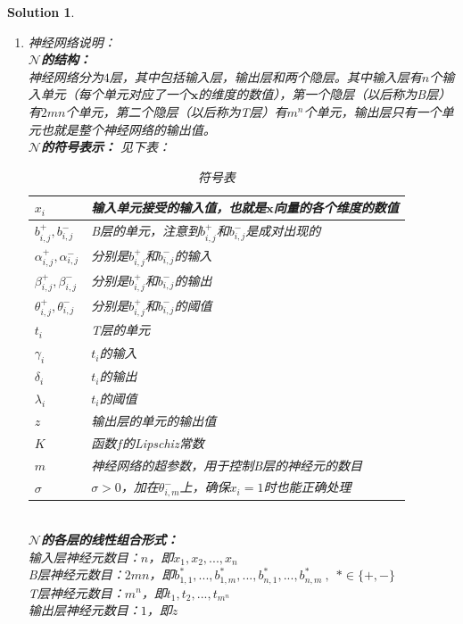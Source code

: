 \documentclass[a4paper,UTF8]{article}
\numberwithin{equation}{section}
\newtheorem*{solution}{Solution}
\begin{document}
\begin{solution}
\begin{enumerate}[ {(}1{)}]
\item 神经网络说明：\\
\textbf{$\mathcal{N}$的结构：}\\
神经网络分为$4$层，其中包括输入层，输出层和两个隐层。其中输入层有$n$个输入单元（每个单元对应了一个$\mathbf{x}$的维度的数值），第一个隐层（以后称为B层）有$2mn$个单元，第二个隐层（以后称为T层）有$m^n$个单元，输出层只有一个单元也就是整个神经网络的输出值。\\
\textbf{$\mathcal{N}$的符号表示：}
见下表：
\begin{table}[!h]
	\centering
	\caption{符号表}
	\label{my-label}
	\begin{tabular}{|l|l|}
		\hline
	$x_i$	& 输入单元接受的输入值，也就是$ \mathbf{x} $向量的各个维度的数值 \\ \hline
	$b_{i,j}^+, b_{i,j}^-$	& B层的单元，注意到$b_{i,j}^+$和$b_{i,j}^-$是成对出现的 \\ \hline
	$\alpha_{i,j}^+,\alpha_{i,j}^-$	& 分别是$b_{i,j}^+$和$b_{i,j}^-$的输入 \\ \hline
	$\beta_{i,j}^+,\beta_{i,j}^-$	& 分别是$b_{i,j}^+$和$b_{i,j}^-$的输出 \\ \hline
	$\theta_{i,j}^+,\theta_{i,j}^-$	& 分别是$b_{i,j}^+$和$b_{i,j}^-$的阈值 \\ \hline
	$t_i$	& T层的单元 \\ \hline
	$\gamma_i$	& $t_i$的输入 \\ \hline
	$\delta_i$	& $t_i$的输出 \\ \hline
	$\lambda_i$	& $t_i$的阈值 \\ \hline
	$z$	& 输出层的单元的输出值 \\ \hline
	$K$	& 函数$f$的Lipschiz常数 \\ \hline
	$m$	& 神经网络的超参数，用于控制B层的神经元的数目\\ \hline
	$\sigma$	& $\sigma>0$，加在$\theta_{i,m}^-$上，确保$x_i=1$时也能正确处理\\ \hline
	\end{tabular}
\end{table}\\
\textbf{$\mathcal{N}$的各层的线性组合形式：}\\
输入层神经元数目：$n$，即$x_1, x_2,...,x_n$\\
B层神经元数目：$2mn$，即$b_{1,1}^*,...,b_{1,m}^*,...,b_{n,1}^*,...,b_{n,m}^*\ ,\ \ *\in \{+,-\}$\\
T层神经元数目：$m^n$，即$t_1,t_2,...,t_{m^n}$\\
输出层神经元数目：$1$，即$z$\\

\end{enumerate}
\end{solution}
\end{document}
